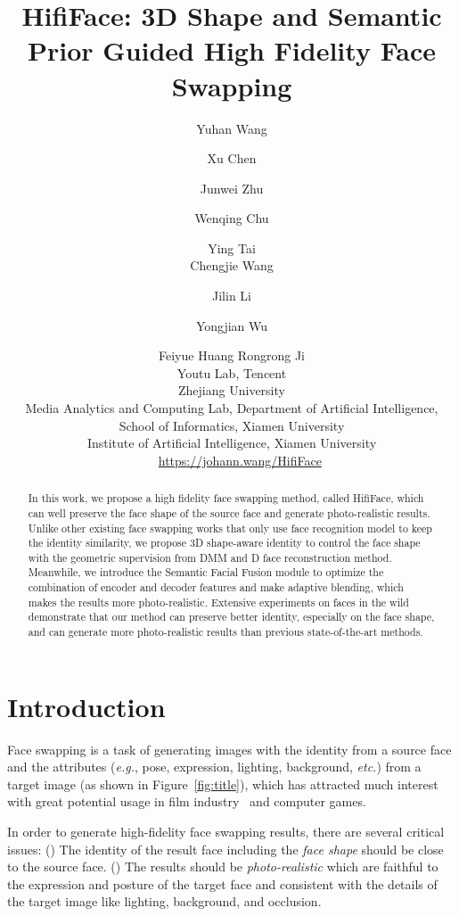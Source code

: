 \documentclass{article}
\title{HifiFace: 3D Shape and Semantic Prior Guided High Fidelity Face Swapping}
\author{
Yuhan Wang\footnotemark[1] \and
Xu Chen\footnotemark[1] \and
Junwei Zhu\and
Wenqing Chu \and
Ying Tai\footnotemark[2] \\
Chengjie Wang \and
Jilin Li \and
Yongjian Wu \and
Feiyue Huang \And
Rongrong Ji \\
\affiliations
{ {Youtu Lab, Tencent}} \\
{ {Zhejiang University}} \\
{ {Media Analytics and Computing Lab, Department of Artificial Intelligence, School of Informatics,
Xiamen University}} \\
{ {Institute of Artiﬁcial Intelligence, Xiamen University}} \\
\emails
{
{~\color{magenta} ~\url{https://johann.wang/HifiFace}}
}
}
\begin{document}
\twocolumn[{\renewcommand\twocolumn[1][]{#1}\maketitle 

\begin{figure}[H] 
\hsize=\textwidth
\centering
\texttt{[image: figures/front\_final.pdf]}
\caption{Face swapping results generated by our HifiFace. 
The face in the target image is replaced by the face in the source image.} 
\label{fig:title} 
\end{figure}
}]






\begin{abstract}
In this work, we propose a high fidelity face swapping method, called HifiFace, which can well preserve the face shape of the source face and generate photo-realistic results. Unlike other existing face swapping works that only use face recognition model to keep the identity similarity, we propose 3D shape-aware identity to control the face shape with the geometric supervision from DMM and D face reconstruction method. Meanwhile, we introduce the Semantic Facial Fusion module to optimize the combination of encoder and decoder features and make adaptive blending, which makes the results more photo-realistic. Extensive experiments on faces in the wild demonstrate that our method can preserve better identity, especially on the face shape, and can generate more photo-realistic results than previous state-of-the-art methods. 
\end{abstract}




\section{Introduction}

Face swapping is a task of generating images with the identity from a source face and the attributes (\textit{e.g.}, pose, expression, lighting, background, \textit{etc.}) from a target image (as shown in Figure~\ref{fig:title}), which has attracted much interest with great potential usage in film industry~\cite{alexander2009creating} and computer games.


In order to generate high-fidelity face swapping results, there are several critical issues: () The identity of the result face including the \textit{face shape} should be close to the source face.   
() The results should be \textit{photo-realistic} which are faithful to the expression and posture of the target face and consistent with the details of the target image like lighting, background, and occlusion.
\end{document}

